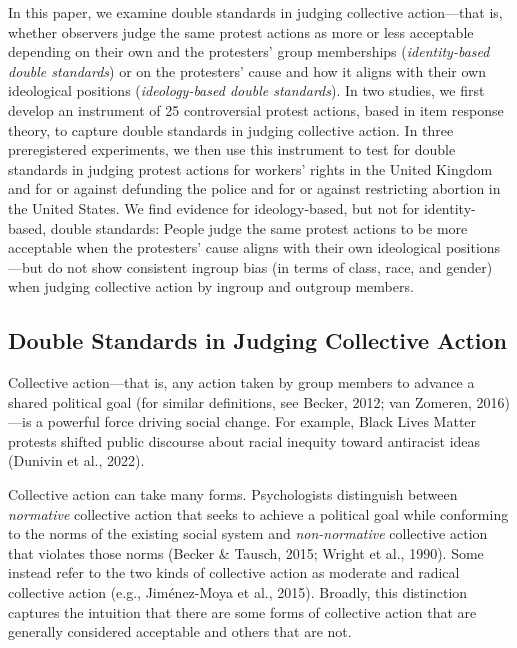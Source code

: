 \documentclass[12pt, letterpaper]{article}
\begin{document}
In this paper, we examine double standards in judging collective
action---that is, whether observers judge the same protest actions as
more or less acceptable depending on their own and the protesters' group
memberships (\emph{identity-based double standards}) or on the
protesters' cause and how it aligns with their own ideological positions
(\emph{ideology-based double standards}). In two studies, we first
develop an instrument of 25 controversial protest actions, based in item
response theory, to capture double standards in judging collective
action. In three preregistered experiments, we then use this instrument
to test for double standards in judging protest actions for workers'
rights in the United Kingdom and for or against defunding the police and
for or against restricting abortion in the United States. We find
evidence for ideology-based, but not for identity-based, double
standards: People judge the same protest actions to be more acceptable
when the protesters' cause aligns with their own ideological
positions---but do not show consistent ingroup bias (in terms of class,
race, and gender) when judging collective action by ingroup and outgroup
members.

\hypertarget{double-standards-in-judging-collective-action}{%
\subsection{Double Standards in Judging Collective
Action}\label{double-standards-in-judging-collective-action}}

Collective action---that is, any action taken by group members to
advance a shared political goal (for similar definitions, see Becker,
2012; van Zomeren, 2016)---is a powerful force driving social change.
For example, Black Lives Matter protests shifted public discourse about
racial inequity toward antiracist ideas (Dunivin et al., 2022).

Collective action can take many forms. Psychologists distinguish between
\emph{normative} collective action that seeks to achieve a political
goal while conforming to the norms of the existing social system and
\emph{non-normative} collective action that violates those norms (Becker
\& Tausch, 2015; Wright et al., 1990). Some instead refer to the two
kinds of collective action as moderate and radical collective action
(e.g., Jiménez-Moya et al., 2015). Broadly, this distinction captures
the intuition that there are some forms of collective action that are
generally considered acceptable and others that are not.
\end{document}
